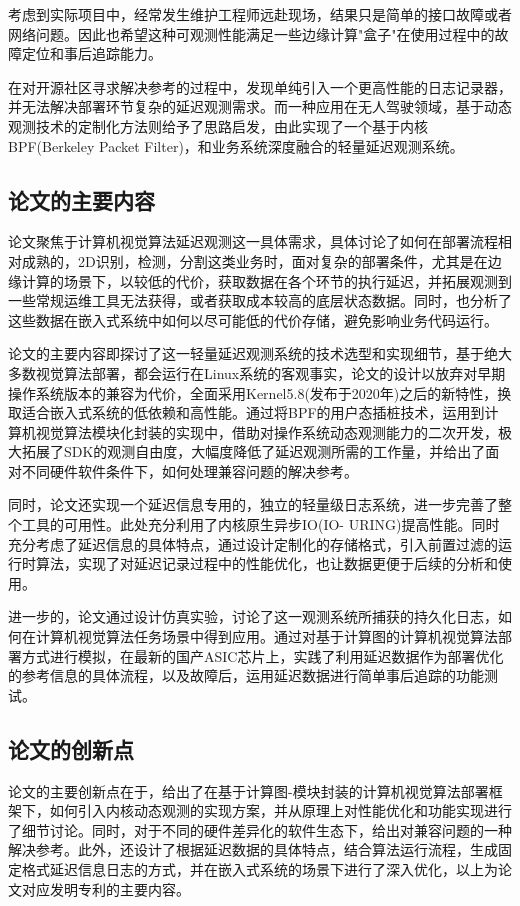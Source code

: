 \documentclass[master,anonymous]{shtthesis}
\begin{document}
考虑到实际项目中，经常发生维护工程师远赴现场，结果只是简单的接口故障或者网络问题。因此也希望这种可观测性能满足一些边缘计算"盒子"在使用过程中的故障定位和事后追踪能力。

在对开源社区寻求解决参考的过程中，发现单纯引入一个更高性能的日志记录器，并无法解决部署环节复杂的延迟观测需求。而一种应用在无人驾驶领域，基于动态观测技术的定制化方法\cite{bpfgpu}则给予了思路启发，由此实现了一个基于内核BPF(Berkeley Packet Filter)\cite{mccanne1993bsd}，和业务系统深度融合的轻量延迟观测系统。
\subsection{论文的主要内容}\label{论文的主要内容}
论文聚焦于计算机视觉算法延迟观测这一具体需求，具体讨论了如何在部署流程相对成熟的，2D识别，检测，分割这类业务时，面对复杂的部署条件，尤其是在边缘计算的场景下，以较低的代价，获取数据在各个环节的执行延迟，并拓展观测到一些常规运维工具无法获得，或者获取成本较高的底层状态数据。同时，也分析了这些数据在嵌入式系统中如何以尽可能低的代价存储，避免影响业务代码运行。

论文的主要内容即探讨了这一轻量延迟观测系统的技术选型和实现细节，基于绝大多数视觉算法部署，都会运行在Linux系统的客观事实，论文的设计以放弃对早期操作系统版本的兼容为代价，全面采用Kernel5.8(发布于2020年)\cite{bpfring}之后的新特性，换取适合嵌入式系统的低依赖和高性能。通过将BPF的用户态插桩技术，运用到计算机视觉算法模块化封装的实现中，借助对操作系统动态观测能力的二次开发，极大拓展了SDK的观测自由度，大幅度降低了延迟观测所需的工作量，并给出了面对不同硬件软件条件下，如何处理兼容问题的解决参考。

同时，论文还实现一个延迟信息专用的，独立的轻量级日志系统，进一步完善了整个工具的可用性。此处充分利用了内核原生异步IO(IO- URING)\cite{axboe2019efficient}提高性能。同时充分考虑了延迟信息的具体特点，通过设计定制化的存储格式，引入前置过滤的运行时算法，实现了对延迟记录过程中的性能优化，也让数据更便于后续的分析和使用。

进一步的，论文通过设计仿真实验，讨论了这一观测系统所捕获的持久化日志，如何在计算机视觉算法任务场景中得到应用。通过对基于计算图的计算机视觉算法部署方式进行模拟，在最新的国产ASIC芯片上，实践了利用延迟数据作为部署优化的参考信息的具体流程，以及故障后，运用延迟数据进行简单事后追踪的功能测试。

\subsection{论文的创新点}\label{论文的创新点}
论文的主要创新点在于，给出了在基于计算图-模块封装的计算机视觉算法部署框架下，如何引入内核动态观测的实现方案，并从原理上对性能优化和功能实现进行了细节讨论。同时，对于不同的硬件差异化的软件生态下，给出对兼容问题的一种解决参考。此外，还设计了根据延迟数据的具体特点，结合算法运行流程，生成固定格式延迟信息日志的方式，并在嵌入式系统的场景下进行了深入优化，以上为论文对应发明专利的主要内容\cite{patent}。
\end{document}
